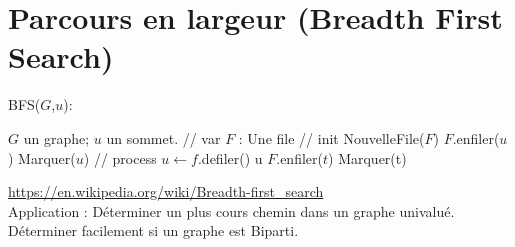 \documentclass{article}
\begin{document}
\newpage
\section{Parcours en largeur (Breadth First Search)}
\begin{algorithm}
\caption{BFS($G$,$u$):}
\begin{algorithmic}
\REQUIRE $G$ un graphe; $u$ un sommet. 
\STATE // var
\STATE $F$ : Une file 
\STATE // init 
\STATE NouvelleFile($F$)
\STATE $F$.enfiler($u$)
\STATE Marquer($u$)
\STATE // process
\STATE $u \leftarrow f$.defiler()
\PRINT u
\STATE $F$.enfiler($t$)
\STATE Marquer(t)
\ENDIF
\ENDFOR
\ENDWHILE
\end{algorithmic}
\end{algorithm}
\url{https://en.wikipedia.org/wiki/Breadth-first_search} \\
Application : Déterminer un plus cours chemin dans un graphe univalué. Déterminer facilement si un graphe est Biparti.  



 
\end{document}
